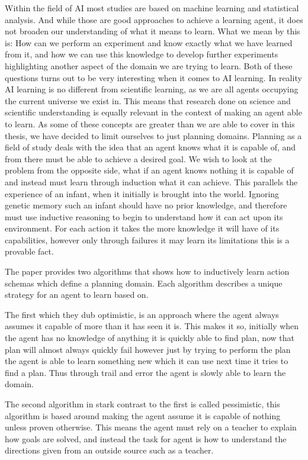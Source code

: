 \documentclass[Master.tex]{subfiles}
\begin{document}
	Within the field of AI most studies are based on 
	machine learning and statistical analysis. And while those are good approaches
	to achieve a learning agent, it does not broaden our understanding of what it means to learn.
	What we mean by this is: How can we perform an experiment and know exactly what we have learned from it, 
	and how we can use this knowledge to develop further experiments highlighting another aspect of the domain we are trying to learn.
	Both of these questions turns out to be very interesting when it comes to AI learning.
	In reality AI learning is no different from scientific learning, as we are all agents occupying the current universe we exist in.
	This means that research done on science and scientific understanding is equally relevant in the context of making an agent able to learn.
	As some of these concepts are greater than we are able to cover in this thesis, we have decided to limit ourselves to just planning domains.	 
	Planning as a field of study deals with the idea that an agent knows what it is capable of, 
	and from there must be able to achieve a desired goal. 
	We wish to look at the problem from the opposite side, what if an agent knows nothing it is capable of and instead must learn through induction what it can achieve. This parallels the experience of an infant, when it initially is brought into the world. Ignoring genetic memory such an infant should have no prior knowledge, and therefore must use inductive reasoning to begin to understand how it can act upon its environment. For each action it takes the more knowledge it will have of its capabilities, however only through failures it may learn its limitations this is a provable fact.
	 
	
	
	The \cite{Walsh2008} paper provides two algorithms that shows how to inductively learn action schemas which define a planning domain. 
	Each algorithm describes a unique strategy for an agent to learn based on. 
	
	The first which they dub optimistic, is an approach where the agent always assumes it capable of more than it has seen it is. This makes it so, initially when the agent has no knowledge of anything it is quickly able to find plan, now that plan will almost always quickly fail however just by trying to perform the plan the agent is able to learn something new which it can use next time it tries to find a plan. Thus through trail and error the agent is slowly able to learn the domain.
	
	The second algorithm in stark contrast to the first is called pessimistic, this algorithm is based around making the agent assume it is capable of nothing unless proven otherwise. This means the agent must rely on a teacher to explain how goals are solved, and instead the task for agent is how to understand the directions given from an outside source such as a teacher.
	
\end{document}
